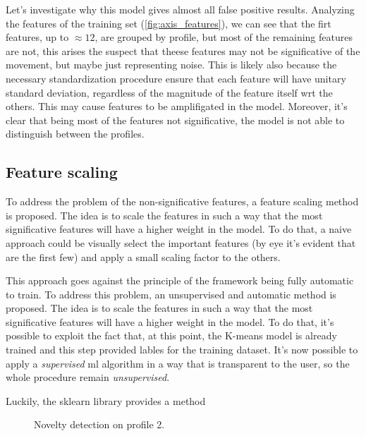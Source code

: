 Let's investigate why this model gives almost all false positive results. Analyzing the features of the training set (\autoref{fig:axis_features}), we can see that the firt features, up to $\approx 12$, are grouped by profile, but most of the remaining features are not, this arises the suspect that theese features may not be significative of the movement, but maybe just representing noise. This is likely also because the necessary standardization procedure ensure that each feature will have unitary standard deviation, regardless of the magnitude of the feature itself \gls{wrt} the others. This may cause  features to be amplifigated in the model. Moreover, it's clear that being most of the features not significative, the model is not able to distinguish between the profiles.

\subsection{Feature scaling}
To address the problem of the non-significative features, a feature scaling method is proposed. The idea is to scale the features in such a way that the most significative features will have a higher weight in the model. To do that, a naive approach could be visually select the important features (by eye it's evident that are the first few) and apply a small scaling factor to the others. 

This approach goes against the principle of the framework being fully automatic to train. To address this problem, an unsupervised and automatic method is proposed. The idea is to scale the features in such a way that the most significative features will have a higher weight in the model. To do that, it's possible to exploit the fact that, at this point, the K-means model is already trained and this step provided lables for the training dataset. It's now possible to apply a \emph{supervised} \gls{ml} algorithm in a way that is transparent to the user, so the whole procedure remain \emph{unsupervised}.

Luckily, the \gls{sklearn} library provides a method 


\begin{figure}
    \centering
    \caption{Novelty detection on profile 2.}
    \label{fig:axis_testing}
\end{figure}